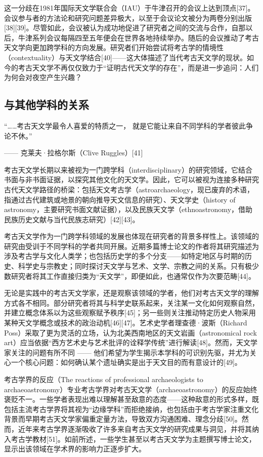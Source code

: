 这一分歧在1981年国际天文学联合会（IAU）于牛津召开的会议上达到顶点[37]。会议参与者的方法论和研究问题差异极大，以至于会议论文被分为两卷分别出版[38][39]。尽管如此，会议被认为成功地促进了研究者之间的交流与合作，自那以后，牛津系列会议每隔四至五年便会在世界各地持续举办。随后的会议推动了考古天文学向更加跨学科的方向发展。研究者们开始尝试将考古学的情境性（contextuality）与天文学结合[40]——这大体描述了当代考古天文学的现状。如今的考古天文学不再仅仅致力于“证明古代天文学的存在”，而是进一步追问：人们为何会对夜空产生兴趣？
\subsection{与其他学科的关系}
“……考古天文学最令人喜爱的特质之一，  
就是它能让来自不同学科的学者彼此争论不休。” 
 
—— 克莱夫·拉格尔斯（Clive Ruggles）[41]

考古天文学长期以来被视为一门跨学科（interdisciplinary）的研究领域，它结合书面与非书面证据，以探究其他文化的天文学。因此，它可以被视为连接多种研究古代天文学路径的桥梁：包括天文考古学（astroarchaeology，现已废弃的术语，指通过古代建筑或地景的朝向推导天文信息的研究）、天文学史（history of astronomy，主要研究书面文献证据），以及民族天文学（ethnoastronomy，借助民族历史文献与当代民族志研究）[42][43]。

考古天文学作为一门跨学科领域的发展也体现在研究者的背景多样性上。该领域的研究由受训于不同学科的学者共同开展。近期多篇博士论文的作者将其研究描述为涉及考古学与文化人类学；也包括历史学的多个分支——如特定地区与时期的历史、科学史与宗教史；同时探讨天文学与艺术、文学、宗教之间的关系。只有极少数研究者将其工作直接归类为“天文学”，即便如此，也通常仅作为次要范畴[44]。

无论是实践中的考古天文学家，还是观察该领域的学者，他们对考古天文学的理解方式各不相同。部分研究者将其与科学史联系起来，关注某一文化如何观察自然，并建立概念体系以为这些观察赋予秩序[45]；另一些则关注推动特定历史人物采用某种天文学概念或技术的政治动机[46][47]。艺术史学者理查德·波斯（Richard Poss）采取了更为灵活的立场，认为北美西南地区的天文岩画（astronomical rock art）应当依据“西方艺术史与艺术批评的诠释学传统”进行解读[48]。然而，天文学家关注的问题有所不同 —— 他们希望为学生揭示本学科的可识别先驱，并尤为关心一个核心问题：如何确认某个遗址确实是出于天文目的而有意设计的[49]。

考古学界的反应（The reactions of professional archaeologists to archaeoastronomy）专业考古学界对考古天文学（archaeoastronomy）的反应始终褒贬不一。一些学者表现出难以理解甚至敌意的态度——这种敌意的形式多样，既包括主流考古学界将其视为“边缘学科”而拒绝接纳，也包括由于考古学家注重文化背景而早期考古天文学家偏重定量方法，导致双方沟通困难、理念分歧[50]。然而，近年来考古学界逐渐吸收了许多来自考古天文学的研究成果与洞见，并将其纳入考古学教材[51]。如前所述，一些学生甚至以考古天文学为主题撰写博士论文，显示出该领域在学术界的影响力正逐步扩大。

